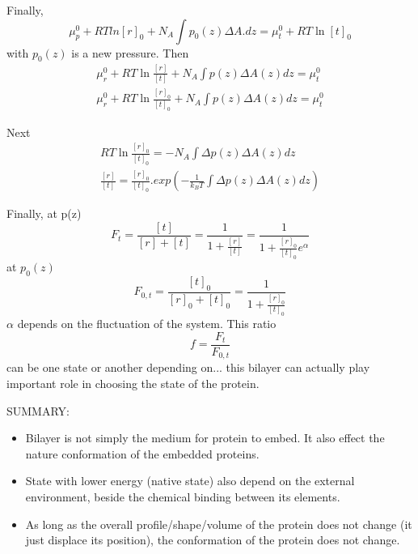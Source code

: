 Finally, 
\begin{equation}
  \label{eq:7}
  \mu_p^0 + RT ln[r]_0 + N_A\int p_0(z) \Delta A.dz = \mu_t^0 + RT\ln[t]_0
\end{equation}
with $p_0(z)$ is a new pressure. Then
\begin{equation}
  \label{eq:8}\begin{split}
  \mu_r^0 + RT\ln\frac{[r]}{[t]} + N_A \int p(z) \Delta A(z) dz =
  \mu_t^0 \\
  \mu_r^0 + RT\ln\frac{[r]_0}{[t]_0} + N_A \int p(z) \Delta A(z) dz =
  \mu_t^0 
\end{split}
\end{equation}

Next
\begin{equation}
  \label{eq:9}
  \begin{split}
    RT\ln \frac{[r]_0}{[t]_0} = -N_A \int \Delta p(z) \Delta A(z) dz
    \\
\frac{[r]}{[t]} = \frac{[r]_0}{[t]_0} .exp \left( -\frac{1}{k_BT}\int
  \Delta p(z) \Delta A(z) dz \right)
  \end{split}
\end{equation}

Finally, at p(z)
\begin{equation}
  \label{eq:10}
  F_t=\frac{[t]}{[r]+[t]} = \frac{1}{1+\frac{[r]}{[t]}}=\frac{1}{1+\frac{[r]_0}{[t]_0}e^\alpha}
\end{equation}
at $p_0(z)$
\begin{equation}
  \label{eq:11}
  F_{0,t} = \frac{[t]_0}{[r]_0+[t]_0} = \frac{1}{1+\frac{[r]_0}{[t]_0}}
\end{equation}
$\alpha$ depends on the fluctuation of the system. This ratio 
\begin{equation}
  \label{eq:12}
  f = \frac{F_t}{F_{0,t}}
\end{equation}
can be one state or another depending on...  this bilayer can actually
play important role in choosing the state of the protein.

SUMMARY:
\begin{itemize}
\item Bilayer is not simply the medium for protein to embed. It also
  effect the nature conformation of the embedded proteins.
\item State with lower energy (native state) also depend on the
  external environment, beside the chemical binding between its
  elements.
\item As long as the overall profile/shape/volume of the protein does
  not change (it just displace its position), the conformation of the
  protein does not change.
\end{itemize}



